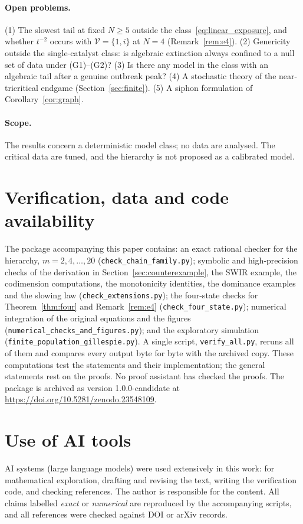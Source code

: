 \documentclass[11pt,a4paper]{article}
\theoremstyle{definition}\newtheorem{definition}[theorem]{Definition}
\theoremstyle{remark}\newtheorem{remark}[theorem]{Remark}
\newcommand{\Vs}{\mathcal V}
\begin{document}
\paragraph{Open problems.}
(1) The slowest tail at fixed $N\ge5$ outside the
class~\eqref{eq:linear_exposure}, and whether $t^{-2}$ occurs with
$\Vs=\{1,i\}$ at $N=4$ (Remark~\ref{rem:e4}). (2) Genericity outside the single-catalyst class:
is algebraic extinction always confined to a null set of data under
(G1)--(G2)? (3) Is there any model in the class with an algebraic tail
after a genuine outbreak peak? (4) A stochastic theory of the
near-tricritical endgame (Section~\ref{sec:finite}). (5) A siphon
formulation of Corollary~\ref{cor:graph}.

\paragraph{Scope.} The results concern a deterministic model class; no
data are analysed. The critical data are tuned, and the hierarchy is not
proposed as a calibrated model.

\section*{Verification, data and code availability}
The package accompanying this paper contains: an exact rational checker
for the hierarchy, $m=2,4,\dots,20$
(\texttt{check\_chain\_family.py}); symbolic and high-precision checks of
the derivation in Section~\ref{sec:counterexample}, the SWIR example,
the codimension computations, the monotonicity identities, the
dominance examples and the slowing law
(\texttt{check\_extensions.py}); the four-state checks for
Theorem~\ref{thm:four} and Remark~\ref{rem:e4} (\texttt{check\_four\_state.py}); numerical
integration of the original equations and the figures
(\texttt{numerical\_checks\_and\_figures.py}); and the exploratory
simulation (\texttt{finite\_population\_gillespie.py}). A single script,
\texttt{verify\_all.py}, reruns all of them and compares every output
byte for byte with the archived copy. These computations test the
statements and their implementation; the general statements rest on the
proofs. No proof assistant has checked the proofs. The package is
archived as version 1.0.0-candidate at
\url{https://doi.org/10.5281/zenodo.23548109}.

\section*{Use of AI tools}
AI systems (large language models) were used extensively in this work:
for mathematical exploration, drafting and revising the text, writing
the verification code, and checking references. The author is
responsible for the content. All claims labelled \emph{exact} or
\emph{numerical} are reproduced by the accompanying scripts, and all
references were checked against DOI or arXiv records.
\end{document}
